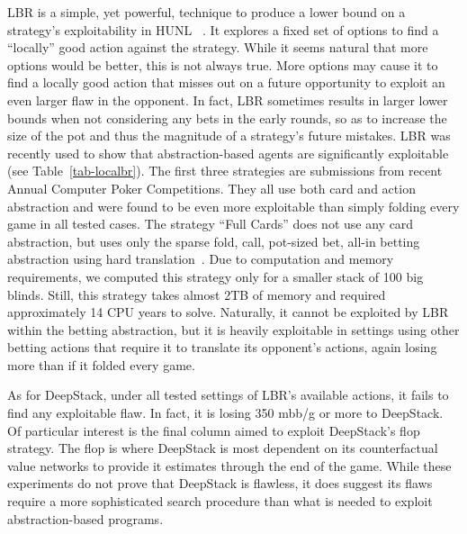 LBR is a simple, yet powerful, technique to produce a lower bound on a strategy's exploitability in HUNL~\cite{Lisy17:LocalBR} .  It explores a fixed set of options to find a ``locally'' good action against the strategy.  While it seems natural that more options would be better, this is not always true.  More options may cause it to find a locally good action that misses out on a future opportunity to exploit an even larger flaw in the opponent.  In fact, LBR sometimes results in larger lower bounds when not considering any bets in the early rounds, so as to increase the size of the pot and thus the magnitude of a strategy's future mistakes.  LBR was recently used to show that abstraction-based agents are significantly exploitable (see Table~\ref{tab-localbr}). The first three strategies are submissions from recent Annual Computer Poker Competitions. They all use both card and action abstraction and were found to be even more exploitable than simply folding every game in all tested cases.  The strategy ``Full Cards'' does not use any card abstraction, but uses only the sparse fold, call, pot-sized bet, all-in betting abstraction using hard translation~\cite{Schnizlein09:Translation}. Due to computation and memory requirements, we computed this strategy only for a smaller stack of 100 big blinds. Still, this strategy takes almost 2TB of memory and required approximately 14 CPU years to solve. Naturally, it cannot be exploited by LBR within the betting abstraction, but it is heavily exploitable in settings using other betting actions that require it to translate its opponent's actions, again losing more than if it folded every game.

As for DeepStack, under all tested settings of LBR's available actions, it fails to find any exploitable flaw.  In fact, it is losing 350 mbb/g  or more to DeepStack.  Of particular interest is the final column aimed to exploit DeepStack's flop strategy.  The flop is where DeepStack is most dependent on its counterfactual value networks to provide it estimates through the end of the game.
While these experiments do not prove that DeepStack is flawless, it does suggest its flaws require a more sophisticated search procedure than what is needed to exploit abstraction-based programs.

